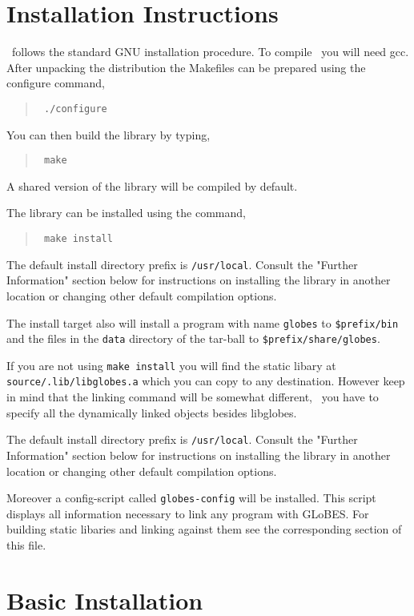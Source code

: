 \begin{appendix}
\section*{Installation Instructions}

\GLOBES\ follows the standard GNU installation procedure.  To compile \GLOBES\
you will need gcc.  After unpacking the distribution
the Makefiles can be prepared using the configure command,
\begin{quote}
{\tt
./configure
}
\end{quote}
You can then build the library by typing,
\begin{quote}
{\tt
make
}
\end{quote}
A shared  version of the library will be compiled by
default. 
 
The library can be installed using the command,
\begin{quote}
{\tt
make install
}
\end{quote}
The default install directory prefix is \verb+/usr/local+.  Consult the
"Further Information" section below for instructions on installing the
library in another location or changing other default compilation
options.

The install target also will install a program with name \verb+globes+ to
\verb+$prefix/bin+ and the files in the \verb+data+ directory of the tar-ball
to \verb+$prefix/share/globes+.

If you are not using \verb+make install+ you will find the static libary
at \verb+source/.lib/libglobes.a+ which you can copy to any destination.
However keep in mind that the linking command will be somewhat different,
\ie\ you have to specify all the dynamically linked objects besides libglobes.

The default install directory prefix is \verb+/usr/local+.  Consult the
"Further Information" section below for instructions on installing the
library in another location or changing other default compilation
options.

Moreover a config-script called \verb+globes-config+ will be installed. This
script displays all information necessary to link any program with GLoBES.
For building static libaries and linking against them see the corresponding
section of this file.

\section*{Basic Installation}


\end{appendix}
